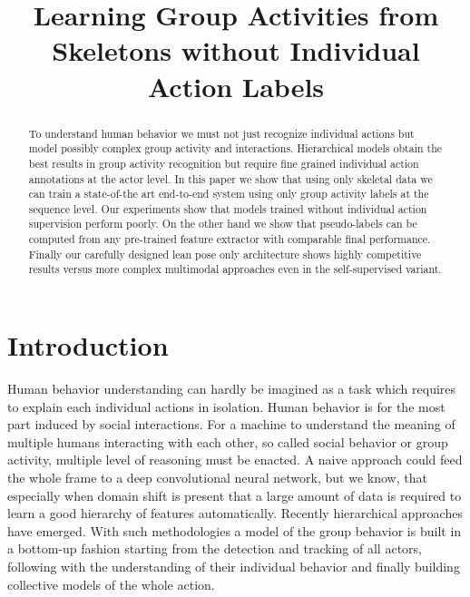 \documentclass[a4paper,conference]{IEEEtran}
\begin{document}
\title{Learning Group Activities from Skeletons without Individual Action Labels }



\author{
}













\maketitle

\begin{abstract}
To understand human behavior we must not just recognize individual actions but model possibly complex group activity and interactions. Hierarchical models obtain the best results in group activity recognition but require fine grained individual action annotations at the actor level. In this paper we show that using only skeletal data we can train a state-of-the art end-to-end system using only group activity labels at the sequence level.
Our experiments show that models trained without individual action supervision perform poorly. On the other hand we show that pseudo-labels can be computed from any pre-trained feature extractor with comparable final performance.
Finally our carefully designed lean pose only architecture shows highly competitive results versus more complex multimodal approaches even in the self-supervised variant.
\end{abstract}






\IEEEpeerreviewmaketitle



\section{Introduction}
Human behavior understanding can hardly be imagined as a task which requires to explain each individual actions in isolation. Human behavior is for the most part induced by social interactions.
For a machine to understand the meaning of multiple humans interacting with each other, so called social behavior or group activity, multiple level of reasoning must be enacted.
A naive approach could feed the whole frame to a deep convolutional neural network, but we know, that especially when domain shift is present that a large amount of data is required to learn a good hierarchy of features automatically. Recently hierarchical approaches have emerged. With such methodologies a model of the group behavior is built in a bottom-up fashion starting from the detection and tracking of all actors, following with the understanding of their individual behavior and finally  building collective models of the whole action.
\end{document}
